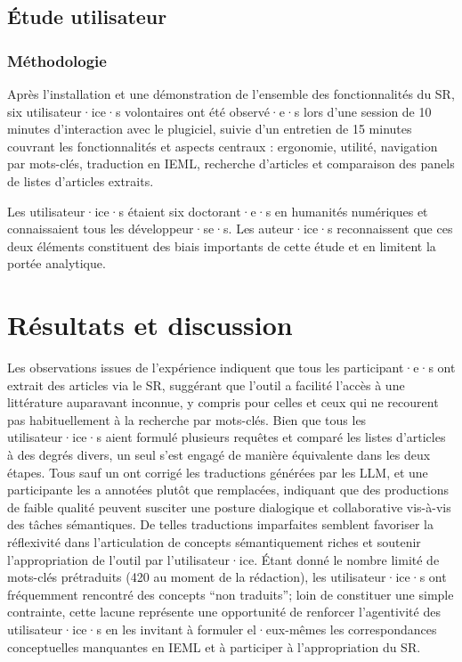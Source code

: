 \documentclass[final,fra]{anthology-ch} %
\begin{document}
\subsection{Étude utilisateur}\label{uxe9tude-utilisateur}

\subsubsection{Méthodologie}\label{muxe9thodologie}

Après l'installation et une démonstration de l'ensemble des
fonctionnalités du SR, six utilisateur·ice·s volontaires ont été
observé·e·s lors d'une session de 10 minutes d'interaction avec le
plugiciel, suivie d'un entretien de 15 minutes couvrant les
fonctionnalités et aspects centraux : ergonomie, utilité, navigation par
mots-clés, traduction en IEML, recherche d'articles et comparaison des
panels de listes d'articles extraits.

Les utilisateur·ice·s étaient six doctorant·e·s en humanités numériques
et connaissaient tous les développeur·se·s. Les auteur·ice·s
reconnaissent que ces deux éléments constituent des biais importants de
cette étude et en limitent la portée analytique.

\section{Résultats et discussion}\label{ruxe9sultats-et-discussion}

Les observations issues de l'expérience indiquent que tous les
participant·e·s ont extrait des articles via le SR, suggérant que
l'outil a facilité l'accès à une littérature auparavant inconnue, y
compris pour celles et ceux qui ne recourent pas habituellement à la
recherche par mots-clés. Bien que tous les utilisateur·ice·s aient
formulé plusieurs requêtes et comparé les listes d'articles à des degrés
divers, un seul s'est engagé de manière équivalente dans les deux
étapes. Tous sauf un ont corrigé les traductions générées par les LLM,
et une participante les a annotées plutôt que remplacées, indiquant que
des productions de faible qualité peuvent susciter une posture
dialogique et collaborative vis-à-vis des tâches sémantiques. De telles
traductions imparfaites semblent favoriser la réflexivité dans
l'articulation de concepts sémantiquement riches et soutenir
l'appropriation de l'outil par l'utilisateur·ice. Étant donné le nombre
limité de mots-clés prétraduits (420 au moment de la rédaction), les
utilisateur·ice·s ont fréquemment rencontré des concepts ``non
traduits''; loin de constituer une simple contrainte, cette lacune
représente une opportunité de renforcer l'agentivité des
utilisateur·ice·s en les invitant à formuler el·eux-mêmes les
correspondances conceptuelles manquantes en IEML et à participer à
l'appropriation du SR.
\end{document}
